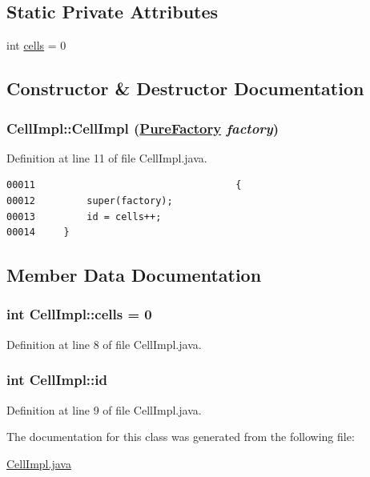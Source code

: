 \subsection*{Static Private Attributes}
\begin{CompactItemize}
\item 
int \hyperlink{classCellImpl_r0}{cells} = 0
\end{CompactItemize}


\subsection{Constructor \& Destructor Documentation}
\hypertarget{classCellImpl_c0}{
\subsubsection[CellImpl]{\setlength{\rightskip}{0pt plus 5cm}Cell\-Impl::Cell\-Impl (\hyperlink{classPureFactory}{Pure\-Factory} {\em factory})}}
\label{classCellImpl_c0}




Definition at line 11 of file Cell\-Impl.java.\footnotesize\begin{verbatim}00011                                   {
00012         super(factory);
00013         id = cells++;
00014     }
\end{verbatim}\normalsize 


\subsection{Member Data Documentation}
\hypertarget{classCellImpl_r0}{
\subsubsection[cells]{\setlength{\rightskip}{0pt plus 5cm}int Cell\-Impl::cells = 0}}
\label{classCellImpl_r0}




Definition at line 8 of file Cell\-Impl.java.\hypertarget{classCellImpl_o0}{
\subsubsection[id]{\setlength{\rightskip}{0pt plus 5cm}int Cell\-Impl::id}}
\label{classCellImpl_o0}




Definition at line 9 of file Cell\-Impl.java.

The documentation for this class was generated from the following file:\begin{CompactItemize}
\item 
\hyperlink{CellImpl_8java-source}{Cell\-Impl.java}\end{CompactItemize}
